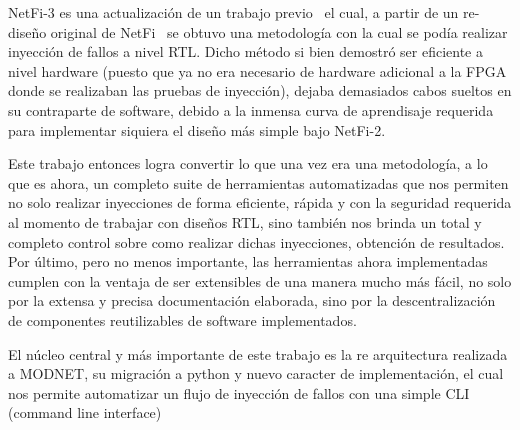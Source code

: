 NetFi-3 es una actualización de un trabajo previo~\cite{netfi2} el cual, a partir de un re-diseño original de NetFi~\cite{6555963} se obtuvo una metodología con la cual se podía realizar inyección de fallos a nivel RTL. Dicho método si bien demostró ser eficiente a nivel hardware (puesto que ya no era necesario de hardware adicional a la FPGA donde se realizaban las pruebas de inyección), dejaba demasiados cabos sueltos en su contraparte de software, debido a la inmensa curva de aprendisaje requerida para implementar siquiera el diseño más simple bajo NetFi-2.

Este trabajo entonces logra convertir lo que una vez era una metodología, a lo que es ahora, un completo suite de herramientas automatizadas que nos permiten no solo realizar inyecciones de forma eficiente, rápida y con la seguridad requerida al momento de trabajar con diseños RTL, sino también nos brinda un total y completo control sobre como realizar dichas inyecciones, obtención de resultados. Por último, pero no menos importante, las herramientas ahora implementadas cumplen con la ventaja de ser extensibles de una manera mucho más fácil, no solo por la extensa y precisa documentación elaborada, sino por la descentralización de componentes reutilizables de software implementados.

El núcleo central y más importante de este trabajo es la re arquitectura realizada a MODNET, su migración a python y nuevo caracter de implementación, el cual nos permite automatizar un flujo de inyección de fallos con una simple CLI (command line interface)